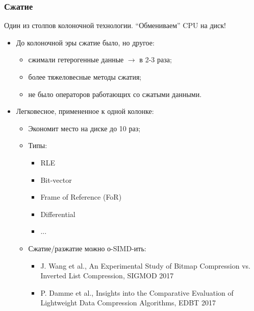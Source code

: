 \documentclass{beamer}
\begin{document}
\begin{frame}
\frametitle{Сжатие}

Один из столпов колоночной технологии. ``Обмениваем'' CPU на диск!

\begin{itemize}
  \setlength\itemsep{1em}
  \item До колоночной эры сжатие было, но другое: 
  \begin{itemize}
    \item сжимали гетерогенные данные $\longrightarrow$ в 2-3 раза;
    \item более тяжеловесные методы сжатия;
    \item не было операторов работающих со сжатыми данными.
  \end{itemize}
  \item Легковесное, примененное к одной колонке:
  \begin{itemize}
    \item Экономит место на диске до 10 раз;
    \item Типы:
    \begin{itemize}
      \item RLE
      \item Bit-vector
      \item Frame of Reference (FoR)
      \item Differential
      \item ...
    \end{itemize}
    \item Сжатие/разжатие можно о-SIMD-ить: 
    \begin{itemize}
    	\item J. Wang et al., An Experimental Study of Bitmap Compression vs. Inverted List Compression, SIGMOD 2017
    	\item P. Damme et al., Insights into the Comparative Evaluation of Lightweight Data Compression Algorithms, EDBT 2017
    \end{itemize}
  \end{itemize}
\end{itemize}

\end{frame}
\end{document}
